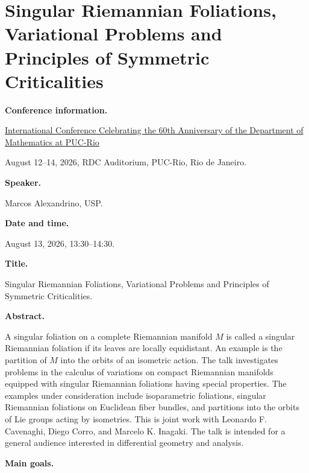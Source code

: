 \section{Singular Riemannian Foliations,
Variational Problems and Principles of
Symmetric Criticalities}
\label{section-singular-riemannian-foliations}

\medskip\noindent
{\bf Conference information.}

\href{%
https://sites.google.com/view/%
60thanniversary-dmat-puc-rio/Home
}{International Conference Celebrating
the 60th Anniversary of the Department
of Mathematics at PUC-Rio}

August 12--14, 2026,
RDC Auditorium, PUC-Rio,
Rio de Janeiro.

\medskip\noindent
{\bf Speaker.}

Marcos Alexandrino, USP.

\medskip\noindent
{\bf Date and time.}

August 13, 2026, 13:30--14:30.

\medskip\noindent
{\bf Title.}

Singular Riemannian Foliations,
Variational Problems and Principles of
Symmetric Criticalities.

\medskip\noindent
{\bf Abstract.}

A singular foliation on a complete
Riemannian manifold $M$ is called a
singular Riemannian foliation if its
leaves are locally equidistant. An example
is the partition of $M$ into the orbits of
an isometric action. The talk investigates
problems in the calculus of variations on
compact Riemannian manifolds equipped with
singular Riemannian foliations having
special properties. The examples under
consideration include isoparametric
foliations, singular Riemannian foliations
on Euclidean fiber bundles, and partitions
into the orbits of Lie groups acting by
isometries. This is joint work with
Leonardo F. Cavenaghi, Diego Corro, and
Marcelo K. Inagaki. The talk is intended
for a general audience interested in
differential geometry and analysis.


\medskip\noindent
{\bf Main goals.}

